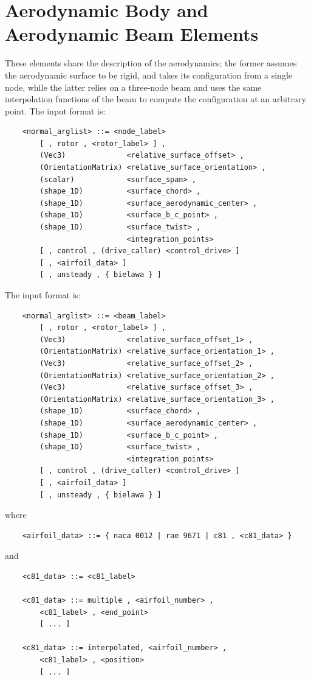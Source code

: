 \section{Aerodynamic Body and Aerodynamic Beam Elements}
These elements share the description of the aerodynamics; the former assumes
the aerodynamic surface to be rigid, and takes its configuration from a
single node, while the latter relies on a three-node beam and uses the
same interpolation functions of the beam to compute the configuration 
at an arbitrary point.
The  input format is:
\begin{verbatim}
    <normal_arglist> ::= <node_label> 
        [ , rotor , <rotor_label> ] ,
        (Vec3)              <relative_surface_offset> , 
        (OrientationMatrix) <relative_surface_orientation> ,
        (scalar)            <surface_span> ,
        (shape_1D)          <surface_chord> ,
        (shape_1D)          <surface_aerodynamic_center> ,
        (shape_1D)          <surface_b_c_point> ,
        (shape_1D)          <surface_twist> ,
                            <integration_points>
        [ , control , (drive_caller) <control_drive> ] 
        [ , <airfoil_data> ]
        [ , unsteady , { bielawa } ]
\end{verbatim}
The  input format is:
\begin{verbatim}
    <normal_arglist> ::= <beam_label> 
        [ , rotor , <rotor_label> ] ,
        (Vec3)              <relative_surface_offset_1> ,       
        (OrientationMatrix) <relative_surface_orientation_1> ,
        (Vec3)              <relative_surface_offset_2> ,
        (OrientationMatrix) <relative_surface_orientation_2> ,
        (Vec3)              <relative_surface_offset_3> ,       
        (OrientationMatrix) <relative_surface_orientation_3> ,
        (shape_1D)          <surface_chord> ,
        (shape_1D)          <surface_aerodynamic_center> ,
        (shape_1D)          <surface_b_c_point> ,
        (shape_1D)          <surface_twist> ,
                            <integration_points>
        [ , control , (drive_caller) <control_drive> ] 
        [ , <airfoil_data> ]
        [ , unsteady , { bielawa } ]
\end{verbatim}
where
\begin{verbatim}
    <airfoil_data> ::= { naca 0012 | rae 9671 | c81 , <c81_data> }
\end{verbatim}
and
\begin{verbatim}
    <c81_data> ::= <c81_label> 

    <c81_data> ::= multiple , <airfoil_number> ,
        <c81_label> , <end_point>
        [ ... ]

    <c81_data> ::= interpolated, <airfoil_number> ,
        <c81_label> , <position>
        [ ... ]
\end{verbatim}
